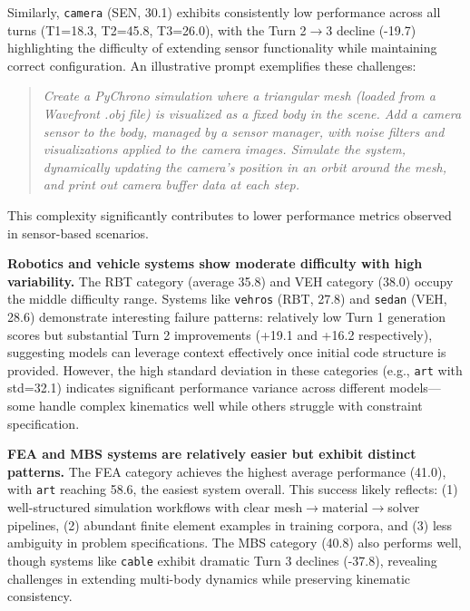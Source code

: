 \documentclass{ieeeaccess}
\begin{document}
Similarly, \texttt{camera} (SEN, 30.1) exhibits consistently low performance across all turns (T1=18.3, T2=45.8, T3=26.0), with the Turn 2$\to$3 decline (-19.7)
 highlighting the difficulty of extending sensor functionality while maintaining correct configuration. An illustrative prompt exemplifies these challenges:

\begin{quote}
\textit{Create a PyChrono simulation where a triangular mesh (loaded from a Wavefront .obj file) is visualized as a fixed body in the scene. Add a camera sensor to the body, managed by a sensor manager, with noise filters and visualizations applied to the camera images. Simulate the system, dynamically updating the camera's position in an orbit around the mesh, and print out camera buffer data at each step.}
\end{quote}

This complexity significantly contributes to lower performance metrics observed in sensor-based scenarios.

\medskip

\textbf{Robotics and vehicle systems show moderate difficulty with high variability.}
The RBT category (average 35.8) and VEH category (38.0) occupy the middle difficulty range. Systems like \texttt{vehros} (RBT, 27.8) and \texttt{sedan} (VEH, 28.6) demonstrate interesting failure patterns: relatively low Turn 1 generation scores but substantial Turn 2 improvements (+19.1 and +16.2 respectively), suggesting models can leverage context effectively once initial code structure is provided. However, the high standard deviation in these categories (e.g., \texttt{art} with std=32.1) indicates significant performance variance across different models—some handle complex kinematics well while others struggle with constraint specification.

\textbf{FEA and MBS systems are relatively easier but exhibit distinct patterns.}
The FEA category achieves the highest average performance (41.0), with \texttt{art} reaching 58.6, the easiest system overall. This success likely reflects: (1) well-structured simulation workflows with clear mesh$\to$material$\to$solver pipelines, (2) abundant finite element examples in training corpora, and (3) less ambiguity in problem specifications. The MBS category (40.8) also performs well, though systems like \texttt{cable} exhibit dramatic Turn 3 declines (-37.8), revealing challenges in extending multi-body dynamics while preserving kinematic consistency.
\end{document}
